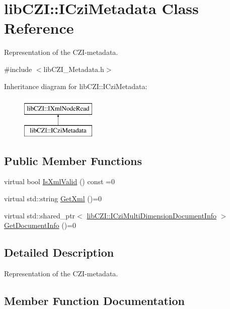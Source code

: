 \hypertarget{classlib_c_z_i_1_1_i_czi_metadata}{}\section{lib\+C\+ZI\+:\+:I\+Czi\+Metadata Class Reference}
\label{classlib_c_z_i_1_1_i_czi_metadata}


Representation of the C\+Z\+I-\/metadata.  




{\ttfamily \#include $<$lib\+C\+Z\+I\+\_\+\+Metadata.\+h$>$}

Inheritance diagram for lib\+C\+ZI\+:\+:I\+Czi\+Metadata\+:\begin{figure}[H]
\begin{center}
\leavevmode
\includegraphics[height=2.000000cm]{classlib_c_z_i_1_1_i_czi_metadata}
\end{center}
\end{figure}
\subsection*{Public Member Functions}
\begin{DoxyCompactItemize}
\item 
virtual bool \hyperlink{classlib_c_z_i_1_1_i_czi_metadata_aa0465981ea6ea4d2165c7dd20e4b6833}{Is\+Xml\+Valid} () const =0
\item 
virtual std\+::string \hyperlink{classlib_c_z_i_1_1_i_czi_metadata_afd73a12ac5a04a725ad9f3d130f4e2de}{Get\+Xml} ()=0
\item 
virtual std\+::shared\+\_\+ptr$<$ \hyperlink{classlib_c_z_i_1_1_i_czi_multi_dimension_document_info}{lib\+C\+Z\+I\+::\+I\+Czi\+Multi\+Dimension\+Document\+Info} $>$ \hyperlink{classlib_c_z_i_1_1_i_czi_metadata_adf1a44d893d1f1aac6639bc39edda5af}{Get\+Document\+Info} ()=0
\end{DoxyCompactItemize}


\subsection{Detailed Description}
Representation of the C\+Z\+I-\/metadata. 

\subsection{Member Function Documentation}
\mbox{\label{classlib_c_z_i_1_1_i_czi_metadata_adf1a44d893d1f1aac6639bc39edda5af}} 
